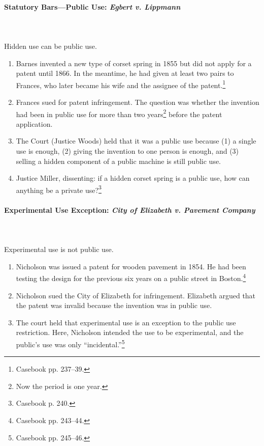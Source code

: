 \paragraph{Statutory Bars---Public Use: \emph{Egbert v. Lippmann}}
~\\\\
Hidden use can be public use.

\begin{enumerate}
    \item Barnes invented a new type of corset spring in 1855 but did not apply 
    for a patent until 1866. In the meantime, he had given at least two pairs to 
    Frances, who later became his wife and the assignee of the 
    patent.\footnote{Casebook pp. 237--39.}
    \item Frances sued for patent infringement. The question was whether the 
    invention had been in public use for more than two years\footnote{Now the 
    period is one year.} before the patent application.
    \item The Court (Justice Woods) held that it was a public use because (1) a 
    single use is enough, (2) giving the invention to one person is enough, and 
    (3) selling a hidden component of a public machine is still public use.
    \item Justice Miller, dissenting: if a hidden corset spring is a public use, 
    how can anything be a private use?\footnote{Casebook p. 240.}
\end{enumerate}

\paragraph{Experimental Use Exception: \emph{City of Elizabeth v. Pavement 
Company}}
~\\\\
Experimental use is not public use.

\begin{enumerate}
    \item Nicholson was issued a patent for wooden pavement in 1854. He had been 
    testing the design for the previous six years on a public street in 
    Boston.\footnote{Casebook pp. 243--44.}
    \item Nicholson sued the City of Elizabeth for infringement. Elizabeth 
    argued that the patent was invalid because the invention was in public use.
    \item The court held that experimental use is an exception to the public use 
    restriction. Here, Nicholson intended the use to be experimental, and the 
    public's use was only ``incidental.''\footnote{Casebook pp. 245--46.}
\end{enumerate}

